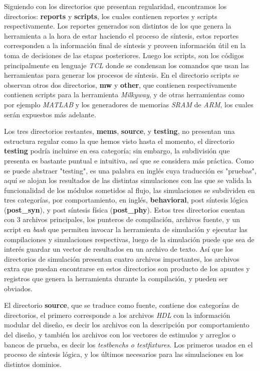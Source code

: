 Siguiendo con los directorios que presentan regularidad, encontramos los directorios: \textbf{reports} y \textbf{scripts}, los cuales contienen reportes y scripts respectivamente. Los reportes generados son distintos de los que genera la herramienta a la hora de estar haciendo el proceso de síntesis, estos reportes corresponden a la información final de síntesis y proveen información útil en la toma de decisiones de las etapas posteriores. Luego los scripts, son los códigos principalmente en lenguaje \textit{TCL} donde se condensan los comandos que usan las herramientas para generar los procesos de síntesis. En el directorio scripts se observan otros dos directorios, \textbf{mw} y \textbf{other}, que contienen respectivamente contienen scripts para la herramienta \textit{Milkyway}, y de otras herramientas como por ejemplo \textit{MATLAB} y los generadores de memorias \textit{SRAM} de \textit{ARM}, los cuales serán expuestos más adelante.

Los tres directorios restantes, \textbf{mems}, \textbf{source}, y \textbf{testing}, no presentan una estructura regular como la que hemos visto hasta el momento, el directorio \textbf{testing} podría incluirse en esa categoría; sin embargo, la subdivisión que presenta es bastante puntual e intuitiva, así que se considera más práctica. Como se puede abstraer "testing", es una palabra en inglés cuya traducción es "pruebas", aquí se alojan los resultados de las distintas simulaciones con las que se valida la funcionalidad de los módulos sometidos al flujo, las simulaciones se subdividen en tres categorías, por comportamiento, en inglés, \textbf{behavioral}, post síntesis lógica (\textbf{post\_syn}), y post síntesis física (\textbf{post\_phy}). Estos tres directorios cuentan con 3 archivos principales, los punteros de compilación, archivos fuente, y un script en \textit{bash} que permiten invocar la herramienta de simulación y ejecutar las compilaciones y simulaciones respectivas, luego de la simulación puede que sea de interés guardar un vector de resultados en un archivo de texto. Así que los directorios de simulación presentan cuatro archivos importantes, los archivos extra que puedan encontrarse en estos directorios son producto de los apuntes y registros que genera la herramienta durante la compilación, y pueden ser obviados.

El directorio \textbf{source}, que se traduce como fuente, contiene dos categorías de directorios, el primero corresponde a los archivos \textit{HDL} con la información modular del diseño, es decir los archivos con la descripción por comportamiento del diseño, y también los archivos con los vectores de estimulos y arreglos o bancos de prueba, es decir los \textit{testbenchs o testfixtures}. Los primeros usados en el proceso de síntesis lógica, y los últimos necesarios para las simulaciones en los distintos dominios.

